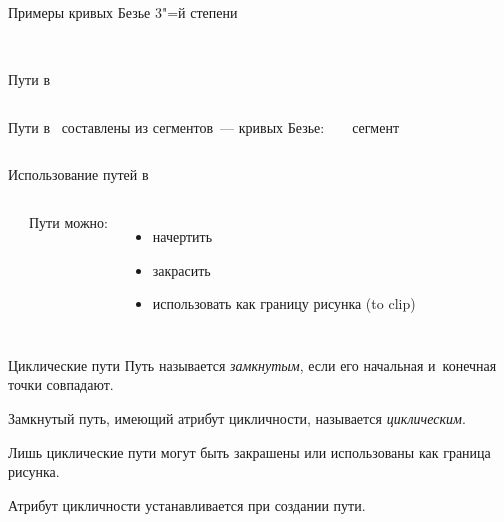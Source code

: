 \begin{frame}{Примеры кривых Безье $3$"=й степени}
\begin{center}
\hfill
\hfill
\\[4ex]
\hfill
\hfill

\end{center}
\end{frame}

\begin{frame}{Пути в~}
\begin{columns}
Пути в~ составлены из сегментов~— кривых Безье:\\
\bigskip
\pause

{\Large
{}%
%
%
%
\ сегмент}
\end{columns}
\end{frame}

\begin{frame}{Использование путей в~}
\begin{columns}
\begin{center}
%
\only<2>{}%
%
\end{center}
Пути можно:
\begin{itemize}
\item\alert<1>{начертить}
\item\alert<2>{закрасить}
\item\alert<3>{использовать как границу рисунка (to clip)}
\end{itemize}
\end{columns}
\begin{center}
\end{center}
\end{frame}

\begin{frame}{Циклические пути}
Путь называется \emph{замкнутым}, если его начальная и~конечная точки
совпадают.

Замкнутый путь, имеющий атрибут цикличности, называется \emph{циклическим}.

Лишь циклические пути могут быть закрашены или использованы как граница
рисунка.

Атрибут цикличности устанавливается при создании пути.
\end{frame}

